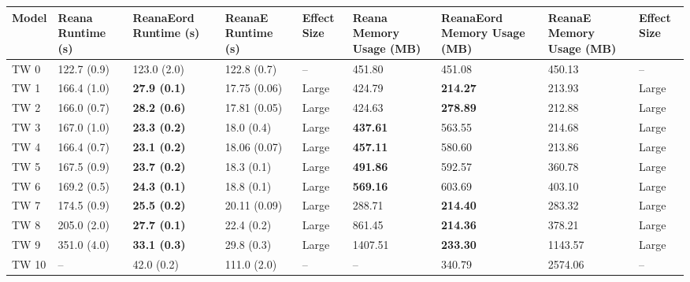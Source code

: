 \begin{tabular}{lllllllll}
\toprule
Model & Reana Runtime (s) & ReanaEord Runtime (s) & ReanaE Runtime (s) & Effect Size & Reana Memory Usage (MB) & ReanaEord Memory Usage (MB) & ReanaE Memory Usage (MB) & Effect Size \\
\midrule
 TW 0 &       122.7 (0.9) &           123.0 (2.0) &        122.8 (0.7) &          -- &                  451.80 &                      451.08 &                   450.13 &          -- \\
 TW 1 &       166.4 (1.0) &   \textbf{27.9 (0.1)} &       17.75 (0.06) &       Large &                  424.79 &             \textbf{214.27} &                   213.93 &       Large \\
 TW 2 &       166.0 (0.7) &   \textbf{28.2 (0.6)} &       17.81 (0.05) &       Large &                  424.63 &             \textbf{278.89} &                   212.88 &       Large \\
 TW 3 &       167.0 (1.0) &   \textbf{23.3 (0.2)} &         18.0 (0.4) &       Large &         \textbf{437.61} &                      563.55 &                   214.68 &       Large \\
 TW 4 &       166.4 (0.7) &   \textbf{23.1 (0.2)} &       18.06 (0.07) &       Large &         \textbf{457.11} &                      580.60 &                   213.86 &       Large \\
 TW 5 &       167.5 (0.9) &   \textbf{23.7 (0.2)} &         18.3 (0.1) &       Large &         \textbf{491.86} &                      592.57 &                   360.78 &       Large \\
 TW 6 &       169.2 (0.5) &   \textbf{24.3 (0.1)} &         18.8 (0.1) &       Large &         \textbf{569.16} &                      603.69 &                   403.10 &       Large \\
 TW 7 &       174.5 (0.9) &   \textbf{25.5 (0.2)} &       20.11 (0.09) &       Large &                  288.71 &             \textbf{214.40} &                   283.32 &       Large \\
 TW 8 &       205.0 (2.0) &   \textbf{27.7 (0.1)} &         22.4 (0.2) &       Large &                  861.45 &             \textbf{214.36} &                   378.21 &       Large \\
 TW 9 &       351.0 (4.0) &   \textbf{33.1 (0.3)} &         29.8 (0.3) &       Large &                 1407.51 &             \textbf{233.30} &                  1143.57 &       Large \\
TW 10 &                -- &            42.0 (0.2) &        111.0 (2.0) &          -- &                      -- &                      340.79 &                  2574.06 &          -- \\

\end{tabular}
